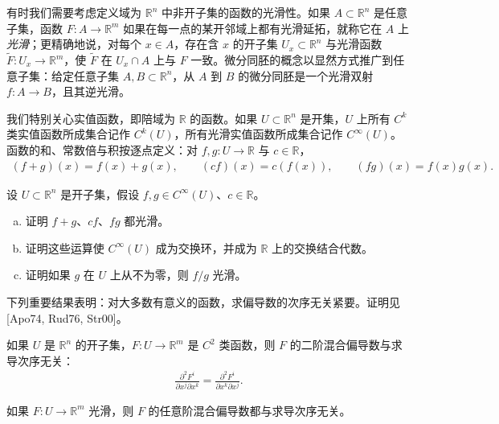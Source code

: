 \documentclass[../../main.tex]{subfiles}
\begin{document}
有时我们需要考虑定义域为 $\mathbb R^n$ 中非开子集的函数的光滑性。如果 $A\subset\mathbb R^n$ 是任意子集，函数 $F:A\to\mathbb R^m$ 如果在每一点的某开邻域上都有光滑延拓，就称它在 $A$ 上\emph{光滑}；更精确地说，对每个 $x\in A$，存在含 $x$ 的开子集 $U_x\subset\mathbb R^n$ 与光滑函数 $\widetilde F:U_x\to\mathbb R^m$，使 $\widetilde F$ 在 $U_x\cap A$ 上与 $F$ 一致。微分同胚的概念以显然方式推广到任意子集：给定任意子集 $A,B\subset\mathbb R^n$，从 $A$ 到 $B$ 的微分同胚是一个光滑双射 $f:A\to B$，且其逆光滑。

我们特别关心实值函数，即陪域为 $\mathbb R$ 的函数。如果 $U\subset\mathbb R^n$ 是开集，$U$ 上所有 $C^k$ 类实值函数所成集合记作 $C^k(U)$，所有光滑实值函数所成集合记作 $C^\infty(U)$。函数的和、常数倍与积按逐点定义：对 $f,g:U\to\mathbb R$ 与 $c\in\mathbb R$，
\begin{align*}
(f+g)(x)=f(x)+g(x),\qquad (cf)(x)=c(f(x)),\qquad (fg)(x)=f(x)g(x).
\end{align*}

\begin{exercise}\label{exercise:appC-C-5}
设 $U\subset\mathbb R^n$ 是开子集，假设 $f,g\in C^\infty(U)$、$c\in\mathbb R$。
\begin{enumerate}[(a)]
\item 证明 $f+g$、$cf$、$fg$ 都光滑。
\item 证明这些运算使 $C^\infty(U)$ 成为交换环，并成为 $\mathbb R$ 上的交换结合代数。
\item 证明如果 $g$ 在 $U$ 上从不为零，则 $f/g$ 光滑。
\end{enumerate}
\end{exercise}

下列重要结果表明：对大多数有意义的函数，求偏导数的次序无关紧要。证明见 [Apo74, Rud76, Str00]。

\begin{proposition}[混合偏导数相等]\label{proposition:appC-mixed-partials}
如果 $U$ 是 $\mathbb R^n$ 的开子集，$F:U\to\mathbb R^m$ 是 $C^2$ 类函数，则 $F$ 的二阶混合偏导数与求导次序无关：
\begin{align*}
\frac{\partial^2 F^i}{\partial x^j\partial x^k}=\frac{\partial^2 F^i}{\partial x^k\partial x^j}.
\end{align*}
\end{proposition}

\begin{corollary}\label{corollary:appC-mixed-partials}
如果 $F:U\to\mathbb R^m$ 光滑，则 $F$ 的任意阶混合偏导数都与求导次序无关。
\end{corollary}
\end{document}
